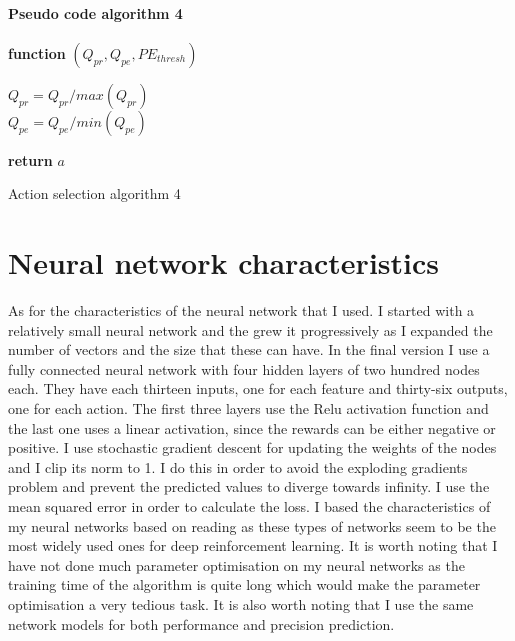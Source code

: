 \paragraph{Pseudo code algorithm 4}
\begin{center}
	\begin{algorithm}[H]

    \textbf{function}  $(Q_{pr},Q_{pe},PE_{thresh})$\;
    
    
    \Indp{}\Indm
    \Indp{} \Indm
    \Indp
    $Q_{pr} = Q_{pr}/max(Q_{pr})$\\
    $Q_{pe} = Q_{pe}/min(Q_{pe})$\\
   
  
   \textbf{return} $a$
   
    
\caption{Action selection algorithm 4}
\end{algorithm}
\end{center}
\section{Neural network characteristics}
As for the characteristics of the neural network that I used. I started with a relatively small neural network and the grew it progressively as I expanded the number of vectors and the size that these can have. In the final version I use a fully connected neural network with four hidden layers of two hundred nodes each. They have each thirteen inputs, one for each feature and thirty-six outputs, one for each action. The first three layers use the Relu activation function and the last one uses a linear activation, since the rewards can be either negative or positive. I use stochastic gradient descent for updating the weights of the nodes and I clip its norm to 1. I do this in order to avoid the exploding gradients problem and prevent the predicted values to diverge towards infinity. I use the mean squared error in order to calculate the loss. I based the characteristics of my neural networks based on reading as these types of networks seem to be the most widely used ones for deep reinforcement learning. It is worth noting that I have not done much parameter optimisation on my neural networks as the training time of the algorithm is quite long which would make the parameter optimisation a very tedious task. It is also worth noting that I use the same network models for both performance and precision prediction.
